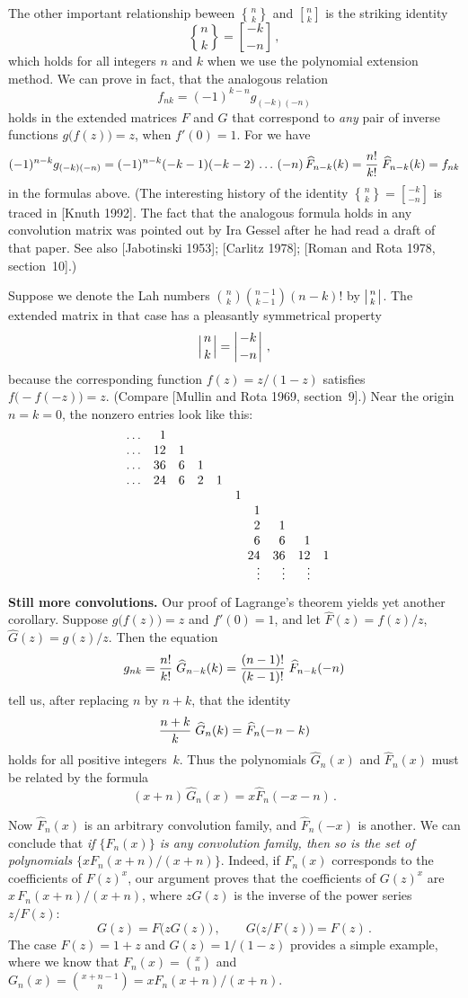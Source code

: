 The other important relationship beween ${n\brace k}$ and ${n\brack
k}$ is the striking identity
$${n\brace k}={-k\brack -n}\,,$$
which holds for all integers $n$ and $k$ when we use the polynomial
extension method. We can prove in fact, that the analogous relation
$$f_{nk}=(-1)^{k-n}g_{(-k)(-n)}$$
holds in the extended matrices $F$ and $G$ that correspond to {\it
any\/} pair of inverse functions $g\bigl(f(z)\bigr)=z$, when
$f'(0)=1$. For we have
$$(-1)^{n-k}g_{(-k)(-n)}=(-1)^{n-k}(-k-1)(-k-2)\,
\ldots\,(-n)\,\widehat{F}_{n-k}(k)
={n!\over k!}\;\widehat{F}_{n-k}(k)=f_{nk}$$
in the formulas above. (The interesting history of the identity
${n\brace k}={-k\brack -n}$ is traced in [Knuth 1992]. The fact that
the analogous
 formula holds in any convolution matrix was pointed out by Ira
Gessel after he had read a draft of that paper. See also 
[Jabotinski 1953]; [Carlitz 1978];
[Roman and Rota 1978, section~10].)

Suppose we denote the Lah numbers ${n\choose k}{n-1\choose k-1}(n-k)!$
by $\left\vert{n\atop k}\right\vert$. The extended matrix in that case
has a pleasantly symmetrical property
$$\left\vert{n\atop k}\right\vert=\left\vert{-k\atop
-n}\right\vert\,,$$
because the corresponding function $f(z)=z/(1-z)$ satisfies
$f\bigl(-f(-z)\bigr)=z$. (Compare
[Mullin and Rota 1969, section~9].)
Near the origin $n=k=0$, the nonzero entries
look like this:
$$\vcenter{\halign{
\hfil#\quad
&\hfil#\quad
&\hfil#\quad
&\hfil#\quad
&\hfil#\quad
&\hfil#\quad
&\hfil#\quad
&\hfil#\quad
&\hfil#\quad
&\hfil#\quad
&\hfil#\cr
$\ldots$&1\cr
$\ldots$&12&1\cr
$\ldots$&36&6&1\cr
$\ldots$&24&6&2&1\cr
&&&&&1\cr
&&&&&&1\cr
&&&&&&2&1\cr
&&&&&&6&6&1\cr
&&&&&&\kern-.5em24&36&12&1\cr
&&&&&&$\vdots$&$\vdots$&$\vdots$\cr
}}$$

\bn
{\bf Still more convolutions.}\enspace
Our proof of Lagrange's theorem yields yet another corollary. Suppose
$g\bigl(f(z)\bigr)=z$ and $f'(0)=1$, and let $\widehat{F}(z)=f(z)/z$,
$\widehat{G}(z)=g(z)/z$. Then the equation
$$g_{nk}={n!\over k!}\;\widehat{G}_{n-k}(k)={(n-1)!\over
(k-1)!}\;\widehat{F}_{n-k}(-n)$$ 
tell us, after replacing $n$ by $n+k$, that the identity
$${n+k\over k}\;\widehat{G}_n(k)=\widehat{F}_n(-n-k)$$
holds for all positive integers~$k$. Thus the polynomials
$\widehat{G}_n(x)$ and $\widehat{F}_n(x)$ must be related by the formula
$$(x+n)\,\widehat{G}_n(x)=x\widehat{F}_n(-x-n)\,.$$

Now $\widehat{F}_n(x)$ is an arbitrary convolution family, and
$\widehat{F}_n(-x)$ is another. We can conclude that {\sl if\/
$\{F_n(x)\}$ is any convolution family, then so is the set of
polynomials\/} $\{xF_n(x+n)/(x+n)\}$.
Indeed, if $F_n(x)$ corresponds to the coefficients of $F(z)^x$, our
argument proves that the coefficients of $G(z)^x$ are
$x\,F_n(x+n)/(x+n)$, where $zG(z)$ is the inverse of the power series
$z/F(z)$:
$$G(z)=F\bigl(zG(z)\bigr)\,,\qquad G\bigl(z/F(z)\bigr)=F(z)\,.$$
The case $F(z)=1+z$ and $G(z)=1/(1-z)$ provides a simple example,
where we know that $F_n(x)={x\choose n}$ and $G_n(x)={x+n-1\choose
n}=xF_n(x+n)/(x+n)$.

